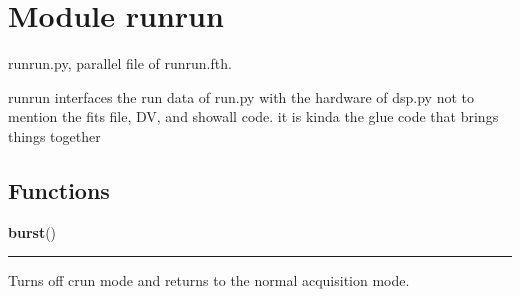 %
%
%


\section{Module runrun}

    \label{runrun}
runrun.py, parallel file of runrun.fth.

runrun interfaces the run data of run.py with the hardware of dsp.py not to
mention the fits file, DV, and showall code. it is kinda the glue code that
brings things together



  \subsection{Functions}

    \label{runrun:burst}

    \vspace{0.5ex}

    \begin{boxedminipage}{\textwidth}

    \raggedright \textbf{burst}()

    \vspace{-1.5ex}

    \rule{\textwidth}{0.5\fboxrule}
    Turns off crun mode and returns to the normal acquisition mode.

    \vspace{1ex}

    \end{boxedminipage}

    \label{runrun:minItime}

    \vspace{0.5ex}


